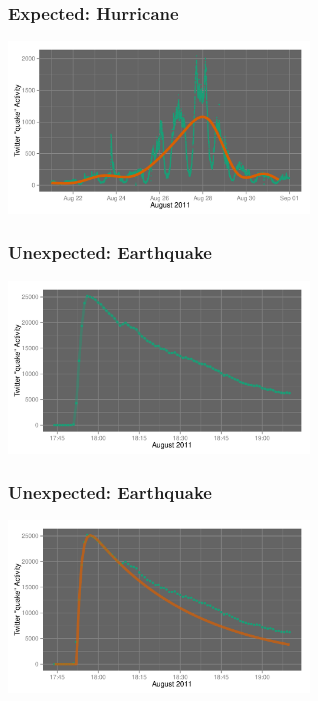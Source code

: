 \documentclass{beamer}
\begin{document}
\begin{frame}\frametitle{Expected: Hurricane}
  \begin{center}
    \includegraphics[width=8cm]{./imgs/hurricane_trend.pdf}
  \end{center}
\end{frame}

\begin{frame}\frametitle{Unexpected: Earthquake}
  \begin{center}
    \includegraphics[width=8cm]{./imgs/va_quake.pdf}
  \end{center}
\end{frame}

\begin{frame}\frametitle{Unexpected: Earthquake}
  \begin{center}
    \includegraphics[width=8cm]{./imgs/va_quake_fit1.pdf}
  \end{center}
\end{frame}

\end{document}
